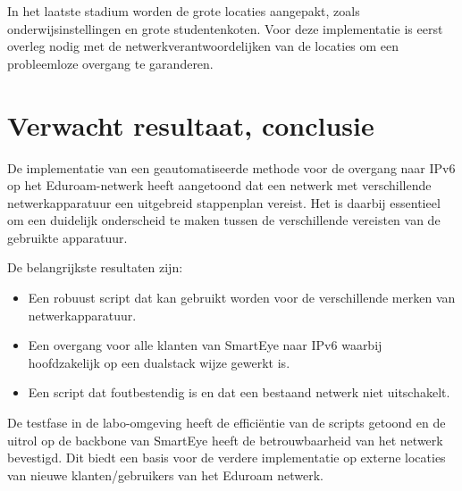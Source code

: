 In het laatste stadium worden de grote locaties aangepakt, zoals onderwijsinstellingen en grote studentenkoten. 
Voor deze implementatie is eerst overleg nodig met de netwerkverantwoordelijken van de locaties om een probleemloze overgang te garanderen.

\section{Verwacht resultaat, conclusie}%
\label{sec:verwachte_resultaten}

De implementatie van een geautomatiseerde methode voor de overgang naar IPv6 op het Eduroam-netwerk heeft aangetoond 
dat een netwerk met verschillende netwerkapparatuur een uitgebreid stappenplan vereist. 
Het is daarbij essentieel om een duidelijk onderscheid te maken tussen de verschillende vereisten van de gebruikte apparatuur.

De belangrijkste resultaten zijn:
\begin{itemize}
    \item Een robuust script dat kan gebruikt worden voor de verschillende merken van netwerkapparatuur.
    \item Een overgang voor alle klanten van SmartEye naar IPv6 waarbij hoofdzakelijk op een dualstack wijze gewerkt is.
    \item Een script dat foutbestendig is en dat een bestaand netwerk niet uitschakelt.
\end{itemize}

De testfase in de labo-omgeving heeft de efficiëntie van de scripts getoond en de uitrol op de backbone van SmartEye heeft de betrouwbaarheid van het netwerk bevestigd. 
Dit biedt een basis voor de verdere implementatie op externe locaties van nieuwe klanten/gebruikers van het Eduroam netwerk.
